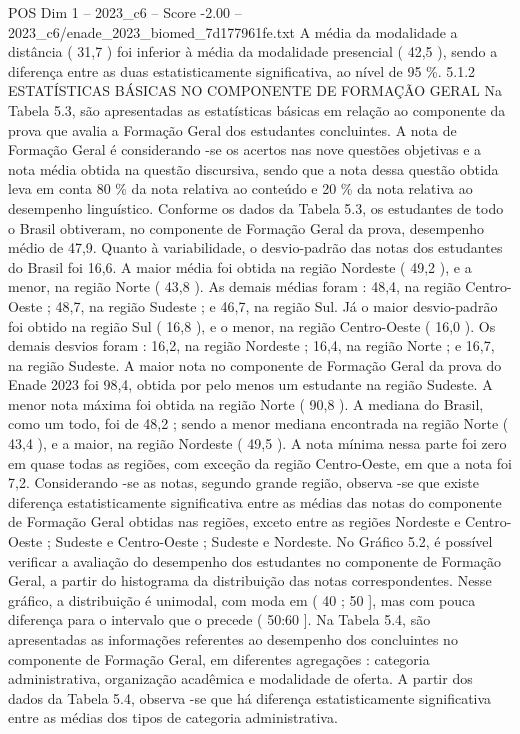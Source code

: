 \begin{textsample}{POS Dim 1 – 2023\_c6 – Score -2.00 – 2023\_c6/enade\_2023\_biomed\_7d177961fe.txt}
A média da modalidade a distância ( 31,7 ) foi inferior à média da modalidade presencial ( 42,5 ), sendo a diferença entre as duas estatisticamente significativa, ao nível de 95 \%. 5.1.2 ESTATÍSTICAS BÁSICAS NO COMPONENTE DE FORMAÇÃO GERAL Na Tabela 5.3, são apresentadas as estatísticas básicas em relação ao componente da prova que avalia a Formação Geral dos estudantes concluintes.
A nota de Formação Geral é considerando -se os acertos nas nove questões objetivas e a nota média obtida na questão discursiva, sendo que a nota dessa questão obtida leva em conta 80 \% da nota relativa ao conteúdo e 20 \% da nota relativa ao desempenho linguístico.
Conforme os dados da Tabela 5.3, os estudantes de todo o Brasil obtiveram, no componente de Formação Geral da prova, desempenho médio de 47,9.
Quanto à variabilidade, o desvio-padrão das notas dos estudantes do Brasil foi 16,6.
A maior média foi obtida na região Nordeste ( 49,2 ), e a menor, na região Norte ( 43,8 ).
As demais médias foram : 48,4, na região Centro-Oeste ; 48,7, na região Sudeste ; e 46,7, na região Sul.
Já o maior desvio-padrão foi obtido na região Sul ( 16,8 ), e o menor, na região Centro-Oeste ( 16,0 ).
Os demais desvios foram : 16,2, na região Nordeste ; 16,4, na região Norte ; e 16,7, na região Sudeste.
A maior nota no componente de Formação Geral da prova do Enade 2023 foi 98,4, obtida por pelo menos um estudante na região Sudeste.
A menor nota máxima foi obtida na região Norte ( 90,8 ).
A mediana do Brasil, como um todo, foi de 48,2 ; sendo a menor mediana encontrada na região Norte ( 43,4 ), e a maior, na região Nordeste ( 49,5 ).
A nota mínima nessa parte foi zero em quase todas as regiões, com exceção da região Centro-Oeste, em que a nota foi 7,2.
Considerando -se as notas, segundo grande região, observa -se que existe diferença estatisticamente significativa entre as médias das notas do componente de Formação Geral obtidas nas regiões, exceto entre as regiões Nordeste e Centro-Oeste ; Sudeste e Centro-Oeste ; Sudeste e Nordeste.
No Gráfico 5.2, é possível verificar a avaliação do desempenho dos estudantes no componente de Formação Geral, a partir do histograma da distribuição das notas correspondentes.
Nesse gráfico, a distribuição é unimodal, com moda em ( 40 ; 50 ], mas com pouca diferença para o intervalo que o precede ( 50:60 ].
Na Tabela 5.4, são apresentadas as informações referentes ao desempenho dos concluintes no componente de Formação Geral, em diferentes agregações : categoria administrativa, organização acadêmica e modalidade de oferta.
A partir dos dados da Tabela 5.4, observa -se que há diferença estatisticamente significativa entre as médias dos tipos de categoria administrativa.

\end{textsample}
